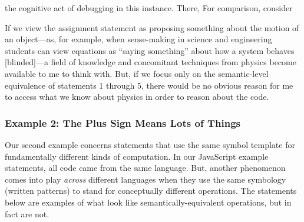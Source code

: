 the cognitive act of debugging in this instance.    There,  For comparison, consider

 If we view the assignment statement as proposing
something about the motion of an object---as, for example, when sense-making in science and engineering students can view equations as ``saying something'' about how a system behaves [blinded]---a
field of knowledge and concomitant techniques from physics become
available to me to think with. But, if we focus only on the
semantic-level equivalence of statements 1 through 5, there would be no
obvious reason for me to access what we know about physics in order to
reason about the code.

\subsubsection{Example 2: The Plus Sign Means Lots of Things}

Our second example concerns statements that use the same symbol template for fundamentally different kinds of computation. In our JavaScript example statements, all code came from the same language. But, another phenomenon comes
into play \emph{across} different languages when they use the same symbology (written patterns) to stand for
conceptually different operations. The statements below are examples of what look
like semantically-equivalent operations, but in fact are not.

\begin{Shaded}
\begin{Highlighting}[]
\end{Highlighting}
\end{Shaded}

\begin{Shaded}
\begin{Highlighting}[]
\OperatorTok{=} \OperatorTok{+} 
\end{Highlighting}
\end{Shaded}

\begin{Shaded}
\begin{Highlighting}[]
\StringTok{ }\StringTok{ }\NormalTok{()}
\end{Highlighting}
\end{Shaded}


